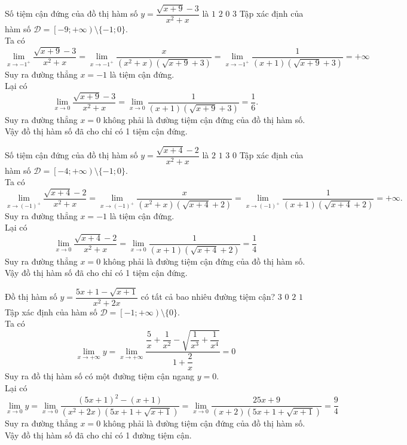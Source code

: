 \begin{ex}%
	Số tiệm cận đứng của đồ thị hàm số $ y=\dfrac{\sqrt{x+9}-3}{x^2+x} $ là 
	\choice
	{\True $ 1 $}
	{$ 2 $}
	{$ 0 $}
	{$ 3 $}
	\loigiai
	{
		Tập xác định của hàm số $ \mathscr{D} = \left[-9;+\infty\right) \setminus \{-1;0\}$.\\
		Ta có 
		\[\lim \limits_{x \to -1^{+}} \dfrac{\sqrt{x+9}-3}{x^2+x}=\lim \limits_{x \to -1^{+}} \dfrac{x}{\left(x^2+x\right)\left(\sqrt{x+9}+3\right)} = \lim \limits_{x \to -1^{+}} \dfrac{1}{(x+1)\left(\sqrt{x+9}+3\right)}=+\infty\]
		Suy ra đường thẳng $ x=-1 $ là tiệm cận đứng.\\
		Lại có 
		\[\lim \limits_{x \to 0} \dfrac{\sqrt{x+9}-3}{x^2+x}= \lim \limits_{x \to 0} \dfrac{1}{(x+1)\left(\sqrt{x+9}+3\right)}=\dfrac{1}{6}.\]
		Suy ra đường thẳng $ x=0 $ không phải là đường tiệm cận đứng của đồ thị hàm số.\\
		Vậy đồ thị hàm số đã cho chỉ có 1 tiệm cận đứng.
	}
\end{ex}
\begin{ex}%
	Số tiệm cận đứng của đồ thị hàm số $ y=\dfrac{\sqrt{x+4}-2}{x^2+x} $ là
	\choice
	{$ 2 $}
	{\True $ 1 $}
	{$ 3 $}
	{$ 0 $}
	\loigiai
	{
		Tập xác định của hàm số $ \mathscr{D} = \left[-4;+\infty\right) \setminus \{-1;0\}$.\\
		Ta có 
		\[\lim \limits_{x \to (-1)^{+}} \dfrac{\sqrt{x+4}-2}{x^2+x}=\lim \limits_{x \to (-1)^{+}} \dfrac{x}{\left(x^2+x\right)\left(\sqrt{x+4}+2\right)} = \lim \limits_{x \to (-1)^{+}} \dfrac{1}{(x+1)\left(\sqrt{x+4}+2\right)}=+\infty.\]
		Suy ra đường thẳng $ x=-1 $ là tiệm cận đứng.\\
		Lại có 
		\[\lim \limits_{x \to 0} \dfrac{\sqrt{x+4}-2}{x^2+x}= \lim \limits_{x \to 0} \dfrac{1}{(x+1)\left(\sqrt{x+4}+2\right)}=\dfrac{1}{4}\]
		Suy ra đường thẳng $ x=0 $ không phải là đường tiệm cận đứng của đồ thị hàm số.\\
		Vậy đồ thị hàm số đã cho chỉ có 1 tiệm cận đứng.
	}
\end{ex}
\begin{ex}%
	Đồ thị hàm số $ y=\dfrac{5x+1-\sqrt{x+1}}{x^2+2x} $ có tất cả bao nhiêu đường tiệm cận?
	\choice
	{$ 3 $}
	{$ 0 $}
	{$ 2 $}
	{\True $ 1 $}
	\loigiai
	{
		Tập xác định của hàm số $ \mathscr{D} = \left[-1;+\infty\right) \setminus \{0\}$.\\
		Ta có 
		\[\lim \limits_{x \to +\infty} y=\lim \limits_{x \to +\infty} \dfrac{\dfrac{5}{x}+\dfrac{1}{x^2}-\sqrt{\dfrac{1}{x^3}+\dfrac{1}{x^4}}}{1+\dfrac{2}{x}}=0\]
		Suy ra đồ thị hàm số có một đường tiệm cận ngang $ y=0 $.\\
		Lại có 
		\[\lim \limits_{x \to 0} y=\lim \limits_{x \to 0} \dfrac{(5x+1)^2-(x+1)}{\left(x^2+2x\right)\left(5x+1+\sqrt{x+1}\right)} = \lim \limits_{x \to 0} \dfrac{25x+9}{\left(x+2\right)\left(5x+1+\sqrt{x+1}\right)}=\dfrac{9}{4}\]
		Suy ra đường thẳng $ x=0 $ không phải là đường tiệm cận đứng của đồ thị hàm số.\\
		Vậy đồ thị hàm số đã cho chỉ có 1 đường tiệm cận.
	}
\end{ex}
